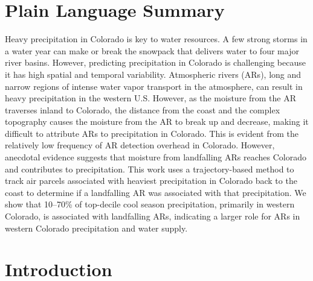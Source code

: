 \documentclass[draft]{agujournal2019}
\begin{document}
\section*{Plain Language Summary}
Heavy precipitation in Colorado is key to water resources. A few strong storms in a water year can make or break the snowpack that delivers water to four major river basins. However, predicting precipitation in Colorado is challenging because it has high spatial and temporal variability. Atmospheric rivers (ARs), long and narrow regions of intense water vapor transport in the atmosphere, can result in heavy precipitation in the western U.S. However, as the moisture from the AR traverses inland to Colorado, the distance from the coast and the complex topography causes the moisture from the AR to break up and decrease, making it difficult to attribute ARs to precipitation in Colorado. This is evident from the relatively low frequency of AR detection overhead in Colorado. However, anecdotal evidence suggests that moisture from landfalling ARs reaches Colorado and contributes to precipitation. This work uses a trajectory-based method to track air parcels associated with heaviest precipitation in Colorado back to the coast to determine if a landfalling AR was associated with that precipitation. We show that 10–70\% of top-decile cool season precipitation, primarily in western Colorado, is associated with landfalling ARs, indicating a larger role for ARs in western Colorado precipitation and water supply.

%
%

\section{Introduction}
\label{intro}
\end{document}
